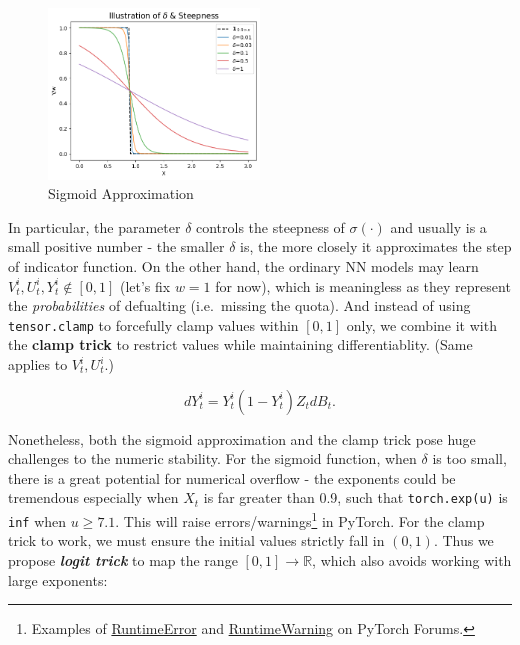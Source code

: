 \documentclass[a4paper,10pt]{article}
\newcommand{\1}{\mathbf{1}}
\begin{document}
\begin{figure}[h]
    \centering
    \includegraphics[width=0.5\textwidth]{FinalReports/Illustration_diagrams/SigmoidApprox.png}
    \caption{Sigmoid Approximation}
    \label{fig:sig-approx}
\end{figure}

In particular, the parameter \(\delta\) controls the steepness of
\(\sigma(\cdot)\) and usually is a small positive number - the smaller
\(\delta\) is, the more closely it approximates the step of indicator
function. On the other hand, the ordinary NN models may learn
\(V_t^i,U_t^i,Y_t^i \notin [0,1]\) (let's fix \(w=1\) for now), which is
meaningless as they represent the \emph{probabilities} of defualting
(i.e.~missing the quota). And instead of using \texttt{tensor.clamp} to
forcefully clamp values within \([0,1]\) only, we combine it with the
\textbf{clamp trick} to restrict values while maintaining
differentiablity. (Same applies to \(V_t^i, U_t^i\).)

\begin{equation}\label{dY_tilde}
    dY_t^i=Y_t^i(1-Y_t^i)Z_tdB_t.
\end{equation}

Nonetheless, both the sigmoid approximation and the clamp trick pose
huge challenges to the numeric stability. For the sigmoid function, when
\(\delta\) is too small, there is a great potential for numerical
overflow - the exponents could be tremendous especially when \(X_t\) is
far greater than 0.9, such that \texttt{torch.exp(u)} is \texttt{inf} when
$u \ge 7.1$. This will raise errors/warnings\footnote{Examples of
  \href{https://discuss.pytorch.org/t/second-order-derivative-with-nan-value-runtimeerror-function-sigmoidbackwardbackward0-returned-nan-values-in-its-0th-output/173260}{RuntimeError}
  and
  \href{https://discuss.pytorch.org/t/output-overflow-and-unstablity-when-use-model-eval/3668}{RuntimeWarning}
  on PyTorch Forums.} in PyTorch. For the clamp trick to work, we must ensure the initial values strictly fall in \((0,1)\). Thus we propose \textbf\textit{logit trick} to map the range $[0,1] \to \mathbb{R}$, which
also avoids working with large exponents:
\end{document}
